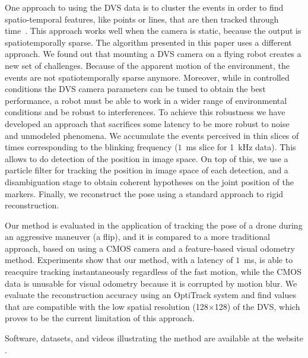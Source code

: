 One approach to using the DVS data is to cluster the events in order
to find spatio-temporal features, like points or lines, that are then
tracked through time~\cite{delbruck07fast,conradt09pencil,Matthias}.
This approach works well when the camera is static, because the output
is spatiotemporally sparse. The algorithm presented in this paper
uses a different approach. We found out that mounting a DVS camera
on a flying robot creates a new set of challenges. Because of the
apparent motion of the environment, the events are not spatiotemporally
sparse anymore. Moreover, while in controlled conditions the DVS camera
parameters can be tuned to obtain the best performance, a robot must
be able to work in a wider range of environmental conditions and be
robust to interferences. To achieve this robustness we have developed
an approach that sacrifices some latency to be more robust to noise
and unmodeled phenomena. We accumulate the events perceived in thin
slices of times corresponding to the blinking frequency ($1$~ms
slice for 1~kHz data). This allows to do detection of the \ALMs
position in image space. On top of this, we use a particle filter
for tracking the position in image space of each detection, and a
disambiguation stage to obtain coherent hypotheses on the joint position
of the markers. Finally, we reconstruct the pose using a standard
approach to rigid reconstruction.

Our method is evaluated in the application of tracking the pose of
a drone during an aggressive maneuver (a flip), and it is compared
to a more traditional approach, based on using a CMOS camera and a
feature-based visual odometry method. Experiments show that our method,
with a latency of $1$~ms, is able to reacquire tracking instantaneously
regardless of the fast motion, while the CMOS data is unusable for
visual odometry because it is corrupted by motion blur. We evaluate
the reconstruction accuracy using an OptiTrack system and find values
that are compatible with the low spatial resolution (128$\times$128)
of the DVS, which proves to be the current limitation of this approach.



Software, datasets, and videos illustrating the method are available
at the website \myurl.
